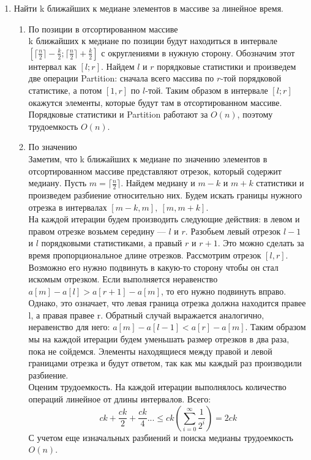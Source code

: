 \documentclass[10pt]{article}
\begin{document}
\begin{enumerate}
	\item Найти k ближайших к медиане элементов в массиве за линейное время.\\
	\begin{enumerate}
		\item По позиции в отсортированном массиве\\
		k ближайших к медиане по позиции будут находиться в интервале $\left [ \lceil \frac{n}{2} \rceil  - \frac{k}{2} ; \lceil \frac{n}{2} \rceil + \frac{k}{2} \right]$ с округлениями в нужную сторону. Обозначим этот интервал как $[l; r]$. Найдем $l$ и $r$ порядковые статистики и произведем две операции Partition: сначала всего массива по $r$-той порядковой статистике, а потом $[1, r]$ по $l$-той. Таким образом в интервале $[l; r]$ окажутся элементы, которые будут там в отсортированном массиве. Порядковые статистики и Partition работают за $O(n)$, поэтому трудоемкость $O(n)$.
		\item По значению\\
		Заметим, что k ближайших к медиане по значению элементов в отсортированном массиве представляют отрезок, который содержит медиану.  Пусть $m = \lceil \frac{n}{2} \rceil$. Найдем медиану и $m-k$ и $m+k$ статистики и произведем разбиение относительно них. Будем искать границы нужного отрезка в интервалах $[m-k, m],\ [m, m+k]$.\\
		На каждой итерации будем производить следующие действия: в левом и правом отрезке возьмем середину --- $l$ и $r$. Разобьем левый отрезок $l-1$ и $l$ порядковыми статистиками, а правый $r$ и $r+1$. Это можно сделать за время пропорциональное длине отрезков. Рассмотрим отрезок $[l, r]$. Возможно его нужно подвинуть в какую-то сторону чтобы он стал искомым отрезком. Если выполняется неравенство $a[m] - a[l] > a[r+1] - a[m]$, то его нужно подвинуть вправо. Однако, это означает, что левая граница отрезка должна находится правее l, а правая правее r. Обратный случай выражается аналогично, неравенство для него: $a[m] - a[l-1] < a[r] - a[m]$. Таким образом мы на каждой итерации будем уменьшать размер отрезков в два раза, пока не сойдемся. Элементы находящиеся между правой и левой границами отрезка и будут ответом, так как мы каждый раз производили разбиение.\\
		Оценим трудоемкость. На каждой итерации выполнялось количество операций линейное от длины интервалов. Всего:\\
		$$c k + \frac{ck}{2} + \frac{ck}{4} ... \le ck \left ( \sum_{i=0}^\infty \frac{1}{2^i} \right) = 2ck$$
		С учетом еще изначальных разбиений и поиска медианы трудоемкость $O(n)$.
	\end{enumerate}
	

\end{enumerate}
\end{document}
